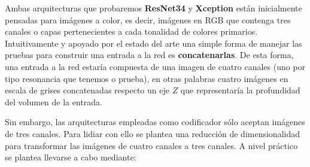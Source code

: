 Ambas arquitecturas que probaremos \textbf{ResNet34} y \textbf{Xception} están inicialmente pensadas para imágenes a color, es decir, imágenes en RGB que contenga tres canales o capas pertenecientes a cada tonalidad de colores primarios. Intuitivamente y apoyado por el estado del arte una simple forma de manejar las pruebas para construir una entrada a la red es \textbf{concatenarlas}. De esta forma, una entrada a la red estaría compuesta de una imagen de cuatro canales (uno por tipo resonancia que tenemos o prueba), en otras palabras cuatro imágenes en escala de grises concatenadas respecto un eje $Z$ que representaría la profundidad del volumen de la entrada.


Sin embargo, las arquitecturas empleadas como codificador sólo aceptan imágenes de tres canales. Para lidiar con ello se plantea una reducción de dimensionalidad para transformar las imágenes de cuatro canales a tres canales. A nivel práctico se plantea llevarse a cabo mediante:

